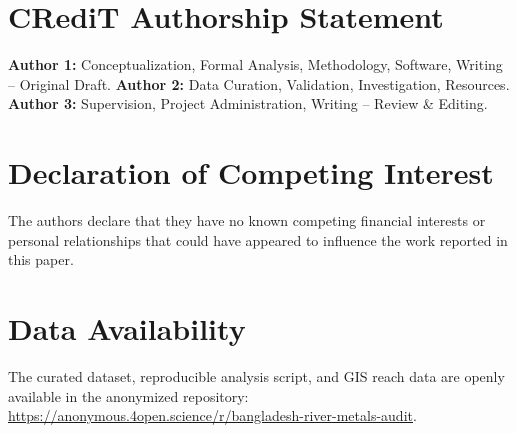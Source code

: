 \documentclass[authoryear,preprint,12pt]{elsarticle}
\begin{document}
\section*{CRediT Authorship Statement}
\textbf{Author 1:} Conceptualization, Formal Analysis, Methodology, Software, Writing -- Original Draft.
\textbf{Author 2:} Data Curation, Validation, Investigation, Resources.
\textbf{Author 3:} Supervision, Project Administration, Writing -- Review \& Editing.

\section*{Declaration of Competing Interest}
The authors declare that they have no known competing financial interests or personal relationships that could have appeared to influence the work reported in this paper.

\section*{Data Availability}
The curated dataset, reproducible analysis script, and GIS reach data are openly available in the anonymized repository:\newline
\url{https://anonymous.4open.science/r/bangladesh-river-metals-audit}.



\end{document}
